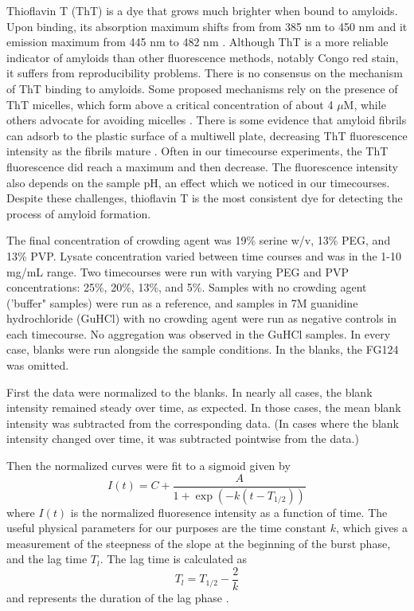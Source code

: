 Thioflavin T (ThT) is a dye that grows much brighter when bound to amyloids.  Upon binding, its absorption maximum shifts from from 385 nm to 450 nm and it emission maximum from 445 nm to 482 nm \cite{picken12}.  Although ThT is a more reliable indicator of amyloids than other fluorescence methods, notably Congo red stain, it suffers from reproducibility problems.  There is no consensus on the mechanism of ThT binding to amyloids.  Some proposed mechanisms rely on the presence of ThT micelles, which form above a critical concentration of about 4 $\mu$M, while others advocate for avoiding micelles \cite{khurana05, groenning09}.  There is some evidence that amyloid fibrils can adsorb to the plastic surface of a multiwell plate, decreasing ThT fluorescence intensity as the fibrils mature \cite{murray13}.  Often in our timecourse experiments, the ThT fluorescence did reach a maximum and then decrease.  The fluorescence intensity also depends on the sample pH, an effect which we noticed in our timecourses.  Despite these challenges, thioflavin T is the most consistent dye for detecting the process of amyloid formation.

The final concentration of crowding agent was 19\% serine w/v, 13\% PEG, and 13\% PVP.  Lysate concentration varied between time courses and was in the 1-10 mg/mL range.  Two timecourses were run with varying PEG and PVP concentrations: 25\%, 20\%, 13\%, and 5\%.  Samples with no crowding agent ('buffer" samples) were run as a reference, and samples in 7M guanidine hydrochloride (GuHCl) with no crowding agent were run as negative controls in each timecourse.  No aggregation was observed in the GuHCl samples.  In every case, blanks were run alongside the sample conditions.  In the blanks, the FG124 was omitted.

First the data were normalized to the blanks.  In nearly all cases, the blank intensity remained steady over time, as expected.  In those cases, the mean blank intensity was subtracted from the corresponding data.  (In cases where the blank intensity changed over time, it was subtracted pointwise from the data.)

Then the normalized curves were fit to a sigmoid given by
\begin{equation}
I(t) = C + \frac{A}{1+\exp \left(-k(t-T_{1/2})\right)}
\label{eq:fit}
\end{equation}
where $I(t)$ is the normalized fluoresence intensity as a function of time.  The useful physical parameters for our purposes are the time constant $k$, which gives a measurement of the steepness of the slope at the beginning of the burst phase, and the lag time $T_l$.  The lag time is calculated as
\begin{equation}
T_l = T_{1/2} - \frac{2}{k}
\end{equation}
and represents the duration of the lag phase \cite{}.  

